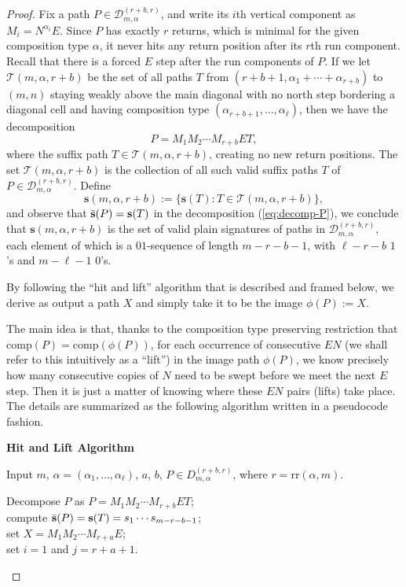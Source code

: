 \documentclass[11pt,a4paper,reqno]{article}
\newcommand{\DD}{\mathcal{D}}
\newcommand{\rr}{\mathrm{rr}}
\newcommand{\al}{\alpha}
\newcommand{\comp}{\mathrm{comp}}
\newcommand{\psig}{\Bar{\mathbf{s}}}
\newcommand{\sig}{\mathbf{s}}
\newcommand{\LiLan}{}
\begin{document}
{\begin{proof}
        
		{\LiLan Fix a path $P\in \DD_{m,\alpha}^{(r+b,r)}$, and write its $i$th vertical component as $M_i = N^{\alpha_i}E$. Since $P$ has exactly $r$ returns, which is minimal for the given composition type $\al$, it never hits any return position after its $r$th run component.} Recall that there is a forced $E$ step after the run components of $P$.
        {\LiLan If we let $\mathcal{T}(m,\alpha,r+b)$ be the set of all paths $T$ from $(r+b+1,\al_1+\cdots+\al_{r+b})$ to $(m,n)$ staying weakly above the main diagonal with no north step bordering a diagonal cell and having composition type $(\al_{r+b+1},\ldots,\al_\ell)$, then we have the decomposition }
        \begin{equation}\label{eq:decomp-P}
        P=M_1M_2\cdots M_{r+b}ET,
        \end{equation}
        {\LiLan where the suffix  path $T\in\mathcal{T}(m,\alpha,r+b)$, creating no new return positions. 
        The set $\mathcal{T}(m,\alpha,r+b)$ is the collection of all such valid suffix paths $T$ of $P\in\DD_{m,\alpha}^{(r+b,r)}$. Define 
        $$
        \sig(m,\alpha,r+b) := \{\sig(T):T\in\mathcal{T}(m,\alpha,r+b)\},
        $$
        and observe that $\psig(P)=\sig(T)$ in the decomposition (\ref{eq:decomp-P}), we conclude that $\sig(m,\alpha,r+b)$ is the set of valid plain signatures of paths in $\DD_{m,\alpha}^{(r+b,r)}$, each element of which is a $01$-sequence of length $m-r-b-1$, with $\ell-r-b$ $1$'s and $m-\ell-1$ $0$'s.}
        
        By following the ``hit and lift'' algorithm that is described and framed below, we derive as output a path $X$ and simply take it to be the image $\phi(P):=X$.

		The main idea is that, thanks to the {\LiLan composition type preserving} restriction that $\comp(P)=\comp(\phi(P))$, for each occurrence of consecutive $EN$ (we shall refer to this intuitively as a ``lift'') in the image path $\phi(P)$, we know precisely how many consecutive copies of $N$ need to be swept before we meet the next $E$ step. Then it is just a matter of knowing where these $EN$ pairs (lifts) take place. The details are summarized as the following algorithm written in a pseudocode fashion. 

		\begin{framed}
		\begin{center}
		 {\bf Hit and Lift Algorithm}
		\end{center}
		\begin{itemize}[leftmargin=5em]
		 {\LiLan \item[{\bf Begin}] Input $m$, $\al=(\al_1,\ldots,\al_\ell)$, $a$, $b$, $P\in D^{(r+b,r)}_{m,\alpha}$, where $r=\rr(\alpha,m)$.
        \item[{\bf Setup}] Decompose $P$ as $P = M_1 M_2\cdots M_{r+b} ET$; \\compute $\psig(P)=\sig(T)=s_1\cdots s_{m-r-b-1}$; \\set $X=M_1M_2\cdots M_{r+a}E$; 
        \\set $i=1$ and $j=r+a+1$.}


\end{itemize}
\end{framed}
\end{proof}}
\end{document}
